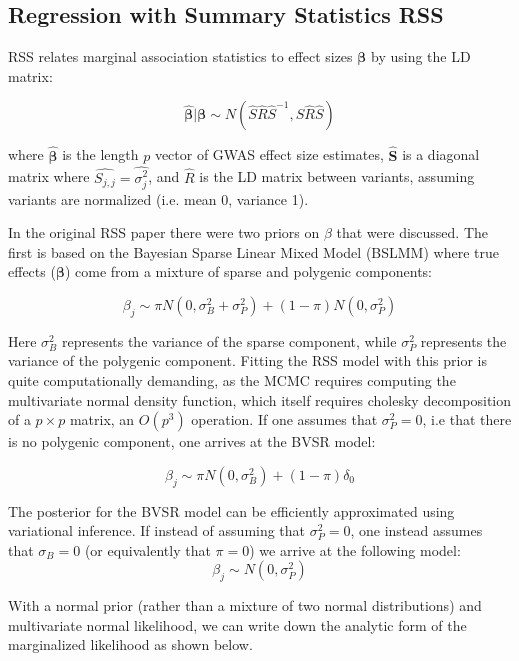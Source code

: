 
\subsection{Regression with Summary Statistics RSS}\label{sec:orgb0b15e2}

RSS relates marginal association statistics to effect sizes $\boldsymbol{\beta}$ by using the LD matrix:

$$ \hat{\boldsymbol{\beta}} | \boldsymbol{\beta} \sim N(\hat{S}\hat{R}\hat{S}^{-1},\hat{S}\hat{R}\hat{S}) $$

where \(\hat{\boldsymbol{\beta}}\) is the length $p$ vector of GWAS effect size estimates,  $\hat{\textbf{S}}$ is a diagonal matrix where $\hat{S_{j,j}}=\hat{\sigma_j^2}$, and $\hat{R}$ is the LD matrix between variants, assuming variants are normalized (i.e. mean 0, variance 1). 

In the original RSS paper there were two priors on \(\beta\) that were discussed.  The first is based on the Bayesian Sparse Linear Mixed Model (BSLMM)\cite{bslmm} where true effects ($\boldsymbol{\beta}$)
come from a mixture of sparse and polygenic components:

$$ \beta_j \sim \pi N(0,\sigma^2_B+\sigma^2_P)+(1-\pi) N(0,\sigma^2_P) $$

Here \(\sigma^2_B\) represents the variance of the sparse component, while \(\sigma^2_P\) represents the variance of the polygenic component. Fitting the RSS model with this prior is quite computationally demanding, 
as the MCMC requires computing the multivariate normal density function, which itself requires cholesky decomposition of a \(p \times p\) matrix, an \(O(p^3)\) operation.  If one assumes that \(\sigma^2_P=0\),
i.e that there is no polygenic component, one arrives at the BVSR model:

$$ \beta_j \sim \pi N(0,\sigma^2_B)+(1-\pi) \delta_0 $$

The posterior for the BVSR model can be efficiently approximated using variational inference. 
If instead of assuming that \(\sigma^2_P=0\), one instead assumes that \(\sigma_B=0\) (or equivalently that \(\pi=0\)) we arrive at the following model: 
$$ \beta_j \sim N(0,\sigma^2_P)$$

With a normal prior (rather than a mixture of two normal distributions) and multivariate normal likelihood, we can write down the analytic form of the marginalized likelihood as shown below.

